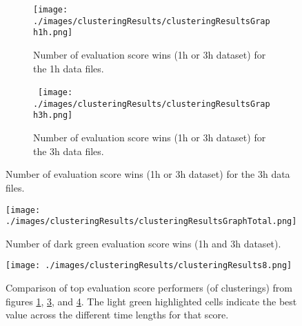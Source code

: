 \begin{figure}
  \centering
  \begin{subfigure}{.475\textwidth}
    \centering
    \texttt{[image: ./images/clusteringResults/clusteringResultsGraph1h.png]}
    \caption{Number of evaluation score wins (1h or 3h dataset) for the 1h data files.}
    \label{figure:clusteringResultsGraph1h}
  \end{subfigure}
  \hfill
  \begin{subfigure}{.475\textwidth}
    \centering
    \  \texttt{[image: ./images/clusteringResults/clusteringResultsGraph3h.png]}
    \caption{Number of evaluation score wins (1h or 3h dataset) for the 3h data files.}
    \label{figure:clusteringResultsGraph3h}
  \end{subfigure}
\end{figure}

\begin{figure}
  \centering
  \texttt{[image: ./images/clusteringResults/clusteringResultsGraphTotal.png]}
  \caption{Number of dark green evaluation score wins (1h and 3h dataset).}
  \label{figure:clusteringResultsGraphTotal}
\end{figure}

\begin{figure}
  \centering
  \texttt{[image: ./images/clusteringResults/clusteringResults8.png]}
  \caption{Comparison of top evaluation score performers (of clusterings) from figures \ref{figure:clusteringResultsGraph1h}, \ref{figure:clusteringResultsGraph3h}, and \ref{figure:clusteringResultsGraphTotal}. The light green highlighted cells indicate the best value across the different time lengths for that score.}
  \label{figure:clusteringResults8}
\end{figure}

\clearpage
